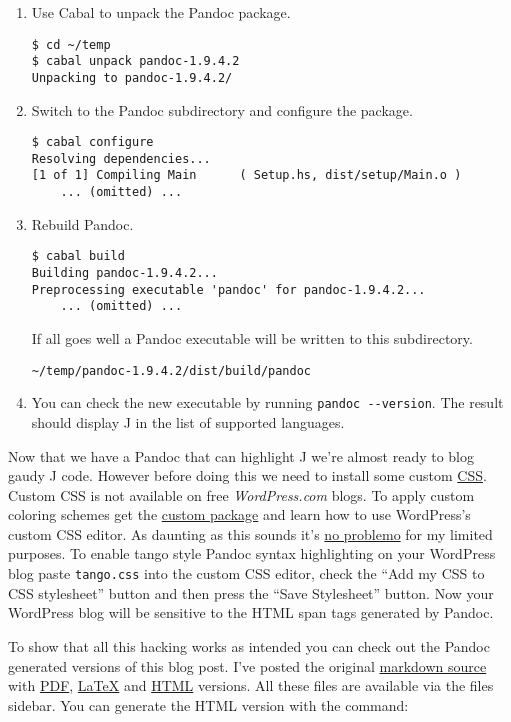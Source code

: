 \documentclass[]{article}
\begin{document}
\begin{enumerate}[1.]
\item
  Use Cabal to unpack the Pandoc package.

\begin{verbatim}
$ cd ~/temp
$ cabal unpack pandoc-1.9.4.2
Unpacking to pandoc-1.9.4.2/
\end{verbatim}
\item
  Switch to the Pandoc subdirectory and configure the package.

\begin{verbatim}
$ cabal configure
Resolving dependencies...
[1 of 1] Compiling Main      ( Setup.hs, dist/setup/Main.o )
    ... (omitted) ...
\end{verbatim}
\item
  Rebuild Pandoc.

\begin{verbatim}
$ cabal build 
Building pandoc-1.9.4.2...
Preprocessing executable 'pandoc' for pandoc-1.9.4.2...
    ... (omitted) ...
\end{verbatim}

  If all goes well a Pandoc executable will be written to this
  subdirectory.

\begin{verbatim}
~/temp/pandoc-1.9.4.2/dist/build/pandoc
\end{verbatim}
\item
  You can check the new executable by running
  \texttt{pandoc -{}-version}. The result should display J in the list
  of supported languages.
\end{enumerate}

Now that we have a Pandoc that can highlight J we're almost ready to
blog gaudy J code. However before doing this we need to install some
custom \href{http://www.htmldog.com/guides/cssbeginner/}{CSS}. Custom
CSS is not available on free \emph{WordPress.com} blogs. To apply custom
coloring schemes get the
\href{http://en.support.wordpress.com/custom-design/}{custom package}
and learn how to use WordPress's custom CSS editor. As daunting as this
sounds it's \href{http://www.youtube.com/watch?v=4QWfrxYt9DQ}{no
problemo} for my limited purposes. To enable tango style Pandoc syntax
highlighting on your WordPress blog paste \texttt{tango.css} into the
custom CSS editor, check the ``Add my CSS to CSS stylesheet'' button and
then press the ``Save Stylesheet'' button. Now your WordPress blog will
be sensitive to the HTML span tags generated by Pandoc.

To show that all this hacking works as intended you can check out the
Pandoc generated versions of this blog post. I've posted the original
\href{https://www.box.com/s/ld5l7y9v7ueo6ml37mqu}{markdown source} with
\href{https://www.box.com/s/0ogxgtmrrzicrn5o9o51}{PDF},
\href{https://www.box.com/s/zbcragtg35tgmciunnpp}{LaTeX} and
\href{https://www.box.com/s/q8lza89lf1s1s5161qkz}{HTML} versions. All
these files are available via the files sidebar. You can generate the
HTML version with the command:
\end{document}
